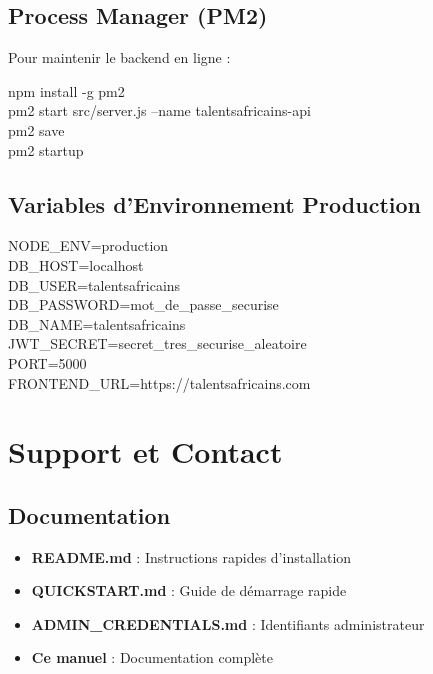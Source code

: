 \documentclass[12pt,a4paper]{article}
\begin{document}
\subsection{Process Manager (PM2)}

Pour maintenir le backend en ligne :

\begin{tcolorbox}[colback=darkcolor!5, colframe=darkcolor, fonttitle=\ttfamily]
npm install -g pm2\\
pm2 start src/server.js --name talentsafricains-api\\
pm2 save\\
pm2 startup
\end{tcolorbox}

\subsection{Variables d'Environnement Production}

\begin{tcolorbox}[colback=yellow!10, colframe=orange, fonttitle=\ttfamily, fontsize=\small]
NODE\_ENV=production\\
DB\_HOST=localhost\\
DB\_USER=talentsafricains\\
DB\_PASSWORD=mot\_de\_passe\_securise\\
DB\_NAME=talentsafricains\\
JWT\_SECRET=secret\_tres\_securise\_aleatoire\\
PORT=5000\\
FRONTEND\_URL=https://talentsafricains.com
\end{tcolorbox}

\newpage
\section{Support et Contact}

\subsection{Documentation}

\begin{itemize}[leftmargin=*]
    \item \textbf{README.md} : Instructions rapides d'installation
    \item \textbf{QUICKSTART.md} : Guide de démarrage rapide
    \item \textbf{ADMIN\_CREDENTIALS.md} : Identifiants administrateur
    \item \textbf{Ce manuel} : Documentation complète
\end{itemize}
\end{document}
